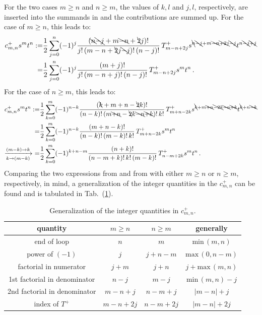 For the two cases $m \geq n$ and $n \geq m$, the values of $k, l$ and $j,l$, respectively, are inserted into the summands in 
and the contributions are summed up.
For the case of $m \geq n$, this leads to:
\begin{align}
     c^{+}_{m,n} s^m t^n
  :=& \frac{1}{2}
      \sum\limits_{j=0}^{n}
    (-1)^{j}
    \frac{(\bcancel{n}\bcancel{-j}+m\bcancel{-n}+\bcancel{2}j)!}{j!\,(m-n+\bcancel{2}j\bcancel{-j})!\,(n-j)!}
    \,T^{+}_{m-n+2j}
    s^{\bcancel{n}\bcancel{-j}+m\bcancel{-n}\bcancel{+2j}\bcancel{-j}} t^{n\bcancel{-j}\bcancel{+j}} \nonumber \\
 =& \frac{1}{2}
    \sum\limits_{j=0}^{n}
    (-1)^{j}
    \frac{(m+j)!}{j!\,(m-n+j)!\,(n-j)!}
    \,T^{+}_{m-n+2j}
    s^m t^n \, . \label{eqn:c_mn_mgeqn}
\end{align}
For the case of $n \geq m$, this leads to:
\begin{align}
     c^{+}_{m,n} s^m t^n
  :=& \frac{1}{2}
      \sum\limits_{k=0}^{m}
    (-1)^{n-k}
    \frac{(\bcancel{k}+m+n-\bcancel{2}k)!}{(n-k)!\,(m\bcancel{+n}-\bcancel{2}k\bcancel{-n}\bcancel{+k})!\,k!}
    \,T^{+}_{m+n-2k}
    s^{\bcancel{k}+m\bcancel{+n}\bcancel{-2k}\bcancel{-n}\bcancel{+k}} t^{\bcancel{k}+n\bcancel{-k}} \nonumber \\
  =& \frac{1}{2}
     \sum\limits_{k=0}^{m}
    (-1)^{n-k}
    \frac{(m+n-k)!}{(n-k)!\,(m-k)!\,k!}
    \,T^{+}_{m+n-2k}
    s^m t^n \nonumber \\
  \xrightarrow[k \rightarrow (m-k)]{(m-k) \rightarrow k} ~
  =& \frac{1}{2}
     \sum\limits_{k=0}^{m}
    (-1)^{k+n-m}
    \frac{(n+k)!}{(n-m+k)!\,k!\,(m-k)!}
    \,T^{+}_{n-m+2k}
    s^m t^n \, . \label{eqn:c_mn_ngeqm}
\end{align}
Comparing the two expressions from  and from  with either $m \geq n$  or $n \geq m$, respectively,
in mind, a generalization of the integer quantities in the $c^{+}_{m,n}$ can be found and is tabulated in Tab.~(\ref{tab:generalization_c_mn}).
\begin{table}[htbp]
  \centering
  \begin{tabular}{c | c | c | c}
    quantity                     & $m \geq n$ & $n \geq m$ & generally                 \\
    \hline
                     end of loop & $n$        & $m$        & $\mathrm{min}\,(m,n)$     \\
                 power of $(-1)$ & $j$        & $j+n-m$    & $\mathrm{max}\,(0, n-m)$  \\
          factorial in numerator & $j+m$      & $j+n$      & $j+\mathrm{max}\,(m,n)$   \\
    1st factorial in denominator & $n-j$      & $m-j$      & $\mathrm{min}\,(m,n) - j$ \\
    2nd factorial in denominator & $m-n+j$    & $n-m+j$    & $|m-n|+j$                 \\
                index of $T^{+}$ & $m-n+2j$   & $n-m+2j$   & $|m-n|+2j$
  \end{tabular}
  \caption{Generalization of the integer quantities in $c^{+}_{m,n}$.}
  \label{tab:generalization_c_mn}
\end{table}


